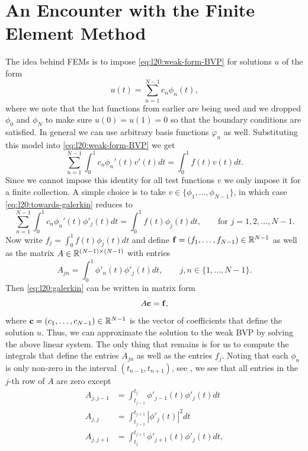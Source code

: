 \section{An Encounter with the Finite Element Method}
The idea behind FEMs is to impose \eqref{eq:l20:weak-form-BVP}
for solutions $u$ of the form 
\begin{equation*}
    u(t) = \sum_{n=1}^{N-1} c_n \phi_n(t),
\end{equation*}
where we note that the hat functions from earlier are being used
and we dropped $\phi_0$ and $\phi_N$ to make sure 
$u(0) = u(1) = 0$ so that the boundary conditions 
are satisfied. 
In general we can use arbitrary basis functions $\varphi_n$ as 
well. Substituting this model into \eqref{eq:l20:weak-form-BVP}
we get 
\begin{equation}\label{eq:l20:towards-galerkin}
  \sum_{n=1}^{N-1} \int_0^1 c_n \phi_n'(t) v'(t) dt
    = \int_0^1 f(t) v(t) dt.
\end{equation}
Since we cannot impose this identity for all test functions $v$ 
we only impose it for a finite collection. A simple choice
is to take $v \in \{ \phi_1, \dots, \phi_{N-1} \}$, in which case 
\eqref{eq:l20:towards-galerkin} reduces to 
\begin{equation}\label{eq:l20:galerkin}
    \sum_{n=1}^{N-1} \int_{0}^1 c_n \phi_n'(t) 
    \phi'_j(t) dt = \int_0^1 f(t) \phi_j(t) dt, \qquad 
    \text{for } j= 1, 2, \dots, N-1.
\end{equation}
Now write $f_j = \int_{0}^1 f(t) \phi_j(t)dt$ and 
define $\mathbf{f} = (f_1, \dots, f_{N-1}) \in \mathbb{R}^{N-1}$ as well as 
the matrix $A \in \mathbb{R}^{(N-1) \times (N-1)}$ with entries 
\begin{equation*}
    A_{jn} = \int_0^1 \phi'_n(t) \phi'_j(t) dt, \qquad 
    j,n \in \{1, \dots, N-1\}.
\end{equation*}
Then \eqref{eq:l20:galerkin} can be written in matrix form 
\begin{equation*}
    A \mathbf{c} = \mathbf{f},
\end{equation*}
where $\mathbf{c} = (c_1, \dots, c_{N-1}) \in \mathbb{R}^{N-1}$ is the vector of 
coefficients that define the solution $u$. Thus, we can approximate 
the solution to the weak BVP by solving the above linear system. 
The only thing that remains is for us to compute the integrals 
that define the entries $A_{jn}$ as well as the entries  
$f_j$. Noting that each $\phi_n$ is only non-zero 
in the interval $(t_{n-1}, t_{n+1})$, see , we see that 
all entries in the $j$-th row of $A$ are zero except 
\begin{equation*}
    \begin{aligned}
            A_{j, j-1} & = \int_{t_{j-1}}^{t_j} \phi'_{j-1}(t) 
            \phi'_j(t) dt\\ 
            A_{j, j}   & = \int_{t_{j-1}}^{t_{j+1}} |\phi'_{j}(t)|^2 dt \\ 
            A_{j, j+1} & = \int_{t_{j}}^{t_{j+1}} \phi'_{j+1}(t) 
            \phi'_j(t) dt,
    \end{aligned}
\end{equation*}
